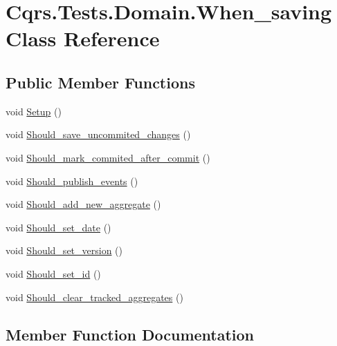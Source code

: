 \hypertarget{classCqrs_1_1Tests_1_1Domain_1_1When__saving}{}\section{Cqrs.\+Tests.\+Domain.\+When\+\_\+saving Class Reference}
\label{classCqrs_1_1Tests_1_1Domain_1_1When__saving}
\subsection*{Public Member Functions}
\begin{DoxyCompactItemize}
\item 
void \hyperlink{classCqrs_1_1Tests_1_1Domain_1_1When__saving_a29fe6aab780ab5acbd6a92924836c839}{Setup} ()
\item 
void \hyperlink{classCqrs_1_1Tests_1_1Domain_1_1When__saving_a4f0cddba76b9867048c951161d2e1724}{Should\+\_\+save\+\_\+uncommited\+\_\+changes} ()
\item 
void \hyperlink{classCqrs_1_1Tests_1_1Domain_1_1When__saving_ae47fd475f9a374c18835555a94f6bb12}{Should\+\_\+mark\+\_\+commited\+\_\+after\+\_\+commit} ()
\item 
void \hyperlink{classCqrs_1_1Tests_1_1Domain_1_1When__saving_a9fcc799db9697469f6de5032abde5c4b}{Should\+\_\+publish\+\_\+events} ()
\item 
void \hyperlink{classCqrs_1_1Tests_1_1Domain_1_1When__saving_a3ee8e1dbc98b99d4dbd1763c460b0528}{Should\+\_\+add\+\_\+new\+\_\+aggregate} ()
\item 
void \hyperlink{classCqrs_1_1Tests_1_1Domain_1_1When__saving_a5d00d678982015f0a02358f859a84d8f}{Should\+\_\+set\+\_\+date} ()
\item 
void \hyperlink{classCqrs_1_1Tests_1_1Domain_1_1When__saving_ade8a12bbe6dbe83ad70f3419bd1354a0}{Should\+\_\+set\+\_\+version} ()
\item 
void \hyperlink{classCqrs_1_1Tests_1_1Domain_1_1When__saving_a62c2e77bad815f023de1947502593a1f}{Should\+\_\+set\+\_\+id} ()
\item 
void \hyperlink{classCqrs_1_1Tests_1_1Domain_1_1When__saving_a7019ce1a593fb978fce8232dab8bece4}{Should\+\_\+clear\+\_\+tracked\+\_\+aggregates} ()
\end{DoxyCompactItemize}


\subsection{Member Function Documentation}
\mbox{\label{classCqrs_1_1Tests_1_1Domain_1_1When__saving_a29fe6aab780ab5acbd6a92924836c839}} 
